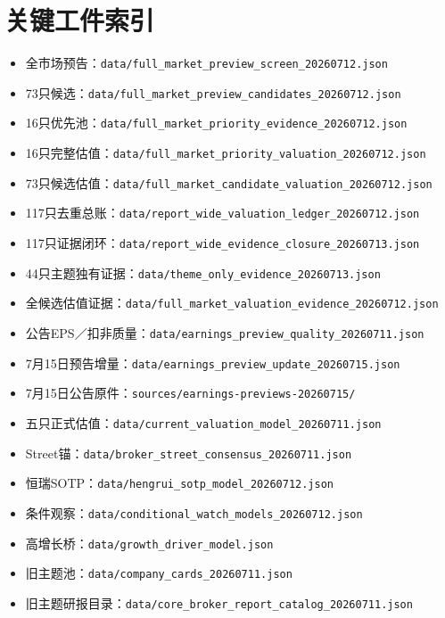 \section{关键工件索引}

\begin{itemize}
  \item 全市场预告：\texttt{data/full\_market\_preview\_screen\_20260712.json}
  \item 73只候选：\texttt{data/full\_market\_preview\_candidates\_20260712.json}
  \item 16只优先池：\texttt{data/full\_market\_priority\_evidence\_20260712.json}
  \item 16只完整估值：\texttt{data/full\_market\_priority\_valuation\_20260712.json}
  \item 73只候选估值：\texttt{data/full\_market\_candidate\_valuation\_20260712.json}
  \item 117只去重总账：\texttt{data/report\_wide\_valuation\_ledger\_20260712.json}
  \item 117只证据闭环：\texttt{data/report\_wide\_evidence\_closure\_20260713.json}
  \item 44只主题独有证据：\texttt{data/theme\_only\_evidence\_20260713.json}
  \item 全候选估值证据：\texttt{data/full\_market\_valuation\_evidence\_20260712.json}
  \item 公告EPS／扣非质量：\texttt{data/earnings\_preview\_quality\_20260711.json}
  \item 7月15日预告增量：\texttt{data/earnings\_preview\_update\_20260715.json}
  \item 7月15日公告原件：\texttt{sources/earnings-previews-20260715/}
  \item 五只正式估值：\texttt{data/current\_valuation\_model\_20260711.json}
  \item Street锚：\texttt{data/broker\_street\_consensus\_20260711.json}
  \item 恒瑞SOTP：\texttt{data/hengrui\_sotp\_model\_20260712.json}
  \item 条件观察：\texttt{data/conditional\_watch\_models\_20260712.json}
  \item 高增长桥：\texttt{data/growth\_driver\_model.json}
  \item 旧主题池：\texttt{data/company\_cards\_20260711.json}
  \item 旧主题研报目录：\texttt{data/core\_broker\_report\_catalog\_20260711.json}
\end{itemize}

